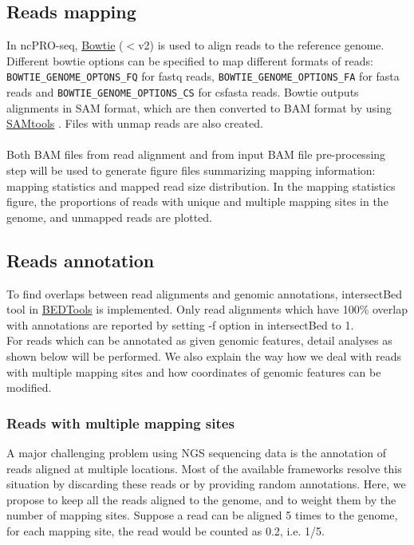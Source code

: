 \documentclass[12pt]{article}
\def \ncpip{ncPRO-seq}
\begin{document}
\subsection{Reads mapping}
In \ncpip{}, \href{http://bowtie-bio.sourceforge.net/index.shtml}{ Bowtie} ($<$v2) \cite{Langmead2009} is used to align reads to the reference genome. Different bowtie options can be specified to map different formats of reads: \verb+BOWTIE_GENOME_OPTONS_FQ+ for fastq reads, \verb+BOWTIE_GENOME_OPTIONS_FA+ for fasta reads and \verb+BOWTIE_GENOME_OPTIONS_CS+ for csfasta reads. Bowtie outputs alignments in SAM format, which are then converted to BAM format by using \href{http://samtools.sourceforge.net/}{ SAMtools} \cite{Li2009}. Files with unmap reads are also created. \\\\
Both BAM files from read alignment and from input BAM file pre-processing step will be used to generate figure files summarizing mapping information: mapping statistics and mapped read size distribution. In the mapping statistics figure, the proportions of reads with unique and multiple mapping sites in the genome, and unmapped reads are plotted. 

\subsection{Reads annotation}
To find overlaps between read alignments and genomic annotations, intersectBed tool in \href{http://code.google.com/p/bedtools/}{ BEDTools} \cite{Quinlan2010} is implemented. Only read alignments which have 100\% overlap with annotations are reported by setting -f option in intersectBed to 1. \\For reads which can be annotated as given genomic features, detail analyses as shown below will be performed. We also explain the way how we deal with reads with multiple mapping sites and how coordinates of genomic features can be modified.

\subsubsection{Reads with multiple mapping sites}
A major challenging problem using NGS sequencing data is the annotation of reads aligned at multiple locations. Most of the available frameworks resolve this situation by discarding these reads or by providing random annotations. Here, we propose to keep all the reads aligned to the genome, and to weight them by the number of mapping sites. Suppose a read can be aligned 5 times to the genome, for each mapping site, the read would be counted as 0.2, i.e. 1/5.
\end{document}
